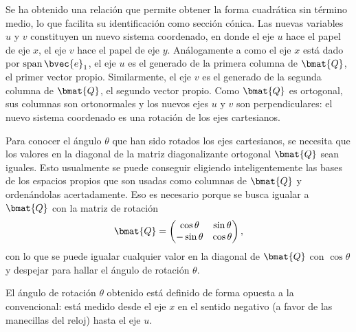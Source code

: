 \documentclass{fmbnotes}
\begin{document}
Se ha obtenido una relación que permite obtener la forma cuadrática sin término medio, lo que facilita su identificación como sección cónica. Las nuevas variables \(u\) y \(v\) constituyen un nuevo sistema coordenado, en donde el eje \(u\) hace el papel de eje \(x\), el eje \(v\) hace el papel de eje \(y\). Análogamente a como el eje \(x\) está dado por \(\operatorname{span}\bvec{e}_1\), el eje \(u\) es el generado de la primera columna de \(\bmat{Q}\), el primer vector propio. Similarmente, el eje \(v\) es el generado de la segunda columna de \(\bmat{Q}\), el segundo vector propio. Como \(\bmat{Q}\) es ortogonal, sus columnas son ortonormales y los nuevos ejes \(u\) y \(v\) son perpendiculares: el nuevo sistema coordenado es una rotación de los ejes cartesianos. 

Para conocer el ángulo \(\theta\) que han sido rotados los ejes cartesianos, se necesita que los valores en la diagonal de la matriz diagonalizante ortogonal \(\bmat{Q}\) sean iguales. Esto usualmente se puede conseguir eligiendo inteligentemente las bases de los espacios propios que son usadas como columnas de \(\bmat{Q}\) y ordenándolas acertadamente. Eso es necesario porque se busca igualar a \(\bmat{Q}\) con la matriz de rotación
\[\bmat{Q}=\begin{pmatrix}
	\cos \theta & \sin\theta \\ -\sin\theta & \cos\theta
\end{pmatrix},\]
con lo que se puede igualar cualquier valor en la diagonal de \(\bmat{Q}\) con \(\cos \theta\) y despejar para hallar el ángulo de rotación \(\theta\).

\begin{advertencia}
	El ángulo de rotación \(\theta\) obtenido está definido de forma opuesta a la convencional: está medido desde el eje \(x\) en el sentido negativo (a favor de las manecillas del reloj) hasta el eje \(u\).
\end{advertencia}
\end{document}
